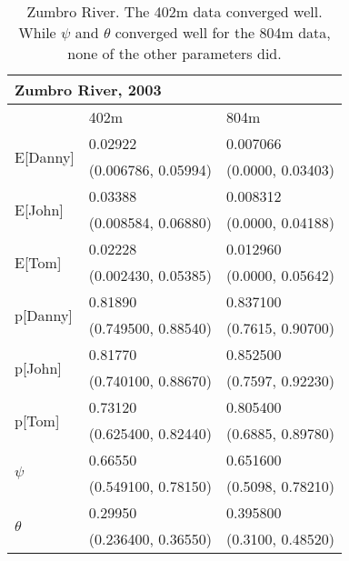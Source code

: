 \documentclass[11pt]{article}
\begin{document}
    \begin{table}
        \caption{Zumbro River. The 402m data converged well. While
        \(\psi\) and \(\theta\) converged well for the 804m data, none of the
        other parameters did.}
        \label{Zumbro}
        \begin{center}
            \begin{tabular}{|l|l|l|}
                \hline
                \multicolumn{3}{|l|}{\textbf{Zumbro River, 2003}} \\
                \hline
                    & 402m & 804m \\
                \hline
                \multirow{2}{*}{E[Danny]}
                    & 0.02922 & 0.007066 \\
                    & (0.006786, 0.05994) & (0.0000, 0.03403) \\
                \hline
                \multirow{2}{*}{E[John]}
                    & 0.03388 & 0.008312 \\
                    & (0.008584, 0.06880) & (0.0000, 0.04188) \\
                \hline
                \multirow{2}{*}{E[Tom]}
                    & 0.02228 & 0.012960 \\
                    & (0.002430, 0.05385) & (0.0000, 0.05642) \\
                \hline
                \multirow{2}{*}{p[Danny]}
                    & 0.81890 & 0.837100 \\
                    & (0.749500, 0.88540) & (0.7615, 0.90700) \\
                \hline
                \multirow{2}{*}{p[John]}
                    & 0.81770 & 0.852500 \\
                    & (0.740100, 0.88670) & (0.7597, 0.92230) \\
                \hline
                \multirow{2}{*}{p[Tom]}
                    & 0.73120 & 0.805400 \\
                    & (0.625400, 0.82440) & (0.6885, 0.89780) \\
                \hline
                \multirow{2}{*}{\(\psi\)}
                    & 0.66550 & 0.651600 \\
                    & (0.549100, 0.78150) & (0.5098, 0.78210) \\
                \hline
                \multirow{2}{*}{\(\theta\)}
                    & 0.29950 & 0.395800 \\
                    & (0.236400, 0.36550) & (0.3100, 0.48520) \\
                \hline
            \end{tabular}
        \end{center}
    \end{table}
\end{document}
